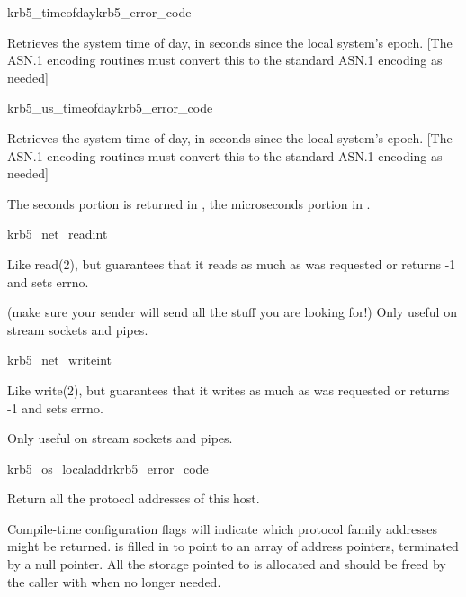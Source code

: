 \begin{funcdecl}{krb5_timeofday}{krb5_error_code}{\funcout}
\end{funcdecl}

Retrieves the system time of day, in seconds since the local system's
epoch.
[The ASN.1 encoding routines must convert this to the standard ASN.1
encoding as needed]

\begin{funcdecl}{krb5_us_timeofday}{krb5_error_code}{\funcout}
\end{funcdecl}

Retrieves the system time of day, in seconds since the local system's
epoch.
[The ASN.1 encoding routines must convert this to the standard ASN.1
encoding as needed]

The seconds portion is returned in , the
microseconds portion in .

\begin{funcdecl}{krb5_net_read}{int}{\funcin}
\funcout
{}
\funcin
{}
\end{funcdecl}

Like read(2), but guarantees that it reads as much as was requested
or returns -1 and sets errno.

(make sure your sender will send all the stuff you are looking for!)
Only useful on stream sockets and pipes.

\begin{funcdecl}{krb5_net_write}{int}{\funcin}
\end{funcdecl}

Like write(2), but guarantees that it writes as much as was requested
or returns -1 and sets errno.

Only useful on stream sockets and pipes.

\begin{funcdecl}{krb5_os_localaddr}{krb5_error_code}{\funcout}
\end{funcdecl}

Return all the protocol addresses of this host.

Compile-time configuration flags will indicate which protocol family
addresses might be returned.
 is filled in to point to an array of address pointers,
terminated by a null pointer.  All the storage pointed to is allocated
and should be freed by the caller with 
when no longer needed.


